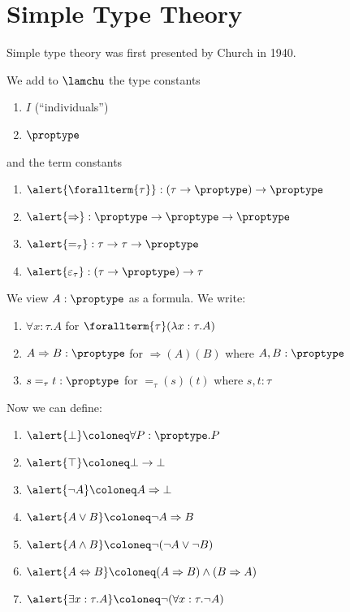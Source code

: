 \section{Simple Type Theory}

Simple type theory was first presented by Church in 1940.

\begin{boxdefi}
    We add to $\lamchu$ the type constants
    \begin{enumerate}
        \item \alert{$I$} (``\alert{individuals}'')
        \item \alert{$\proptype$}
    \end{enumerate}
    and the term constants
    \begin{enumerate}
        \item $\alert{\forallterm{\tau}} : (\tau \to \proptype) \to \proptype$
        \item $\alert{{\Rightarrow}} : \proptype \to \proptype \to \proptype$
        \item $\alert{=_\tau} : \tau \to \tau \to \proptype$
        \item $\alert{\varepsilon_\tau} : (\tau \to \proptype) \to \tau$
    \end{enumerate}
    We view $A : \proptype$ as a formula.
    We write:
    \begin{enumerate}
        \item $\forall x : \tau. A$ for $\forallterm{\tau}(\lambda x : \tau.A)$
        \item $A \Rightarrow B : \proptype$ for ${\Rightarrow} (A)(B)$ where $A, B : \proptype$
        \item $s =_\tau t : \proptype$ for ${=_\tau}(s)(t)$ where $s, t : \tau$
    \end{enumerate}
    Now we can define:
    \begin{enumerate}
        \item $\alert{\bot} \coloneq \forall P : \proptype. P$
        \item $\alert{\top} \coloneq \bot \to \bot$
        \item $\alert{\neg A} \coloneq A \Rightarrow \bot$
        \item $\alert{A \vee B} \coloneq \neg A \Rightarrow B$
        \item $\alert{A \wedge B} \coloneq \neg (\neg A \vee \neg B)$
        \item $\alert{A \Leftrightarrow B} \coloneq (A \Rightarrow B) \wedge (B \Rightarrow A)$
        \item $\alert{\exists x : \tau. A} \coloneq \neg (\forall x : \tau. \neg A)$
    \end{enumerate}
\end{boxdefi}

